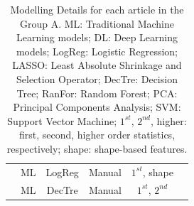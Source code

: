 \documentclass{article}
\begin{document}
\begin{table}[]
\begin{tabular}{cccccc}
        \cite{Tu2020}                       & ML                             & LogReg                                         & Manual                        & $1^{st}$, shape                    \\
        \cite{Romeo2018}                    & ML                             & DecTre                                         & Manual                        & $1^{st}$, $2^{nd}$                 \\
        \bottomrule
    \end{tabular}
    \caption{Modelling Details  for each article in the Group A. ML: Traditional Machine Learning models; DL: Deep Learning models; LogReg: Logistic Regression; LASSO: Least Absolute Shrinkage and Selection Operator; DecTre: Decision Tree; RanFor: Random Forest; PCA: Principal Components Analysis; SVM: Support Vector Machine; $1^{st}$, $2^{nd}$, higher: first, second, higher order statistics, respectively; shape: shape-based features.}
    \label{tab:model_A}
\end{table}
\end{document}
